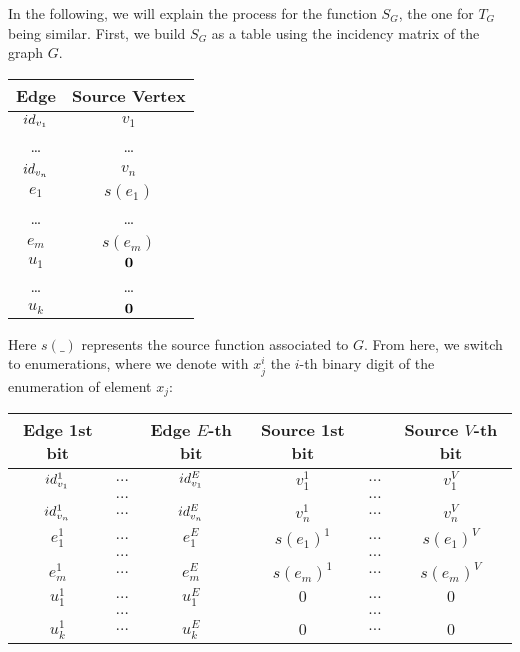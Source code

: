 In the following, we will explain the process for the function $S_G$, 
the one for $T_G$ being similar. First, we build $S_G$ as a table using the incidency 
matrix of the graph $G$.
%
%
\begin{center}\scriptsize
  \begin{tabular}{c|c}
    Edge & Source Vertex\\
  \hline
    $id_{v_1}$   & $v_1$\\
    \dots              & \dots \\
    $id_{v_n}$   & $v_n$ \\
    $e_1$           & $s(e_1)$ \\
    \dots             & \dots \\
    $e_m$          & $s(e_m)$\\
    $u_1$           & $\textbf{0}$ \\
    \dots             & \dots \\
    $u_k$           & $\textbf{0}$\\
  \end{tabular}
\end{center}
%
Here $s(\_)$ represents the source function associated to $G$.
From here, we switch to enumerations, where we denote 
with $x^i_j$ the $i$-th binary digit of the enumeration of 
element $x_j$:
%
%
\begin{center}\scriptsize
  \begin{tabular}{ccc|ccc}
    Edge 1st bit & & Edge $E$-th bit & Source 1st bit && Source $V$-th bit\\
  \hline
    $id_{v_1}^1$ & $\dots$ & $id_{v_1}^E$ & $v_1^1$       & $\dots$ & $v_1^V$\\
                           & $\dots$ &                         &                      & $\dots$ & \\
    $id_{v_n}^1$ & $\dots$ & $id_{v_n}^E$ & $v_n^1$       & $\dots$ & $v_n^V$\\
    $e_1^1$          & $\dots$ & $e_1^E$         & $s(e_1)^1$   & $\dots$ & $s(e_1)^V$\\
                            & $\dots$ &                        &                      & $\dots$ & \\
    $e_m^1$         & $\dots$ & $e_m^E$        & $s(e_m)^1$  & $\dots$ & $s(e_m)^V$\\
    $u_1^1$          & $\dots$ & $u_1^E$         & $0$               & $\dots$ & $0$\\
                            & $\dots$ &                        &                      & $\dots$ & \\
    $u_k^1$          & $\dots$ & $u_k^E$         & $0$               & $\dots$ & $0$\\
  \end{tabular}
\end{center}
